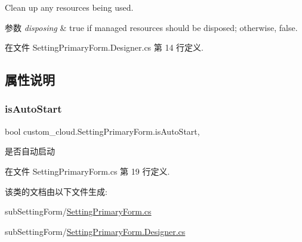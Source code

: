 Clean up any resources being used. 


\begin{DoxyParams}{参数}
{\em disposing} & true if managed resources should be disposed; otherwise, false.\\
\hline
\end{DoxyParams}


在文件 Setting\+Primary\+Form.\+Designer.\+cs 第 14 行定义.



\subsection{属性说明}
\mbox{\label{classcustom__cloud_1_1_setting_primary_form_a26c7f21a43f8c27d9a9b78b7b9675b98}} 
\subsubsection{\texorpdfstring{is\+Auto\+Start}{isAutoStart}}
{\footnotesize\ttfamily bool custom\+\_\+cloud.\+Setting\+Primary\+Form.\+is\+Auto\+Start\hspace{0.3cm}{\ttfamily [get]}, {\ttfamily [set]}}



是否自动启动 



在文件 Setting\+Primary\+Form.\+cs 第 19 行定义.



该类的文档由以下文件生成\+:\begin{DoxyCompactItemize}
\item 
sub\+Setting\+Form/\hyperlink{_setting_primary_form_8cs}{Setting\+Primary\+Form.\+cs}\item 
sub\+Setting\+Form/\hyperlink{_setting_primary_form_8_designer_8cs}{Setting\+Primary\+Form.\+Designer.\+cs}\end{DoxyCompactItemize}
